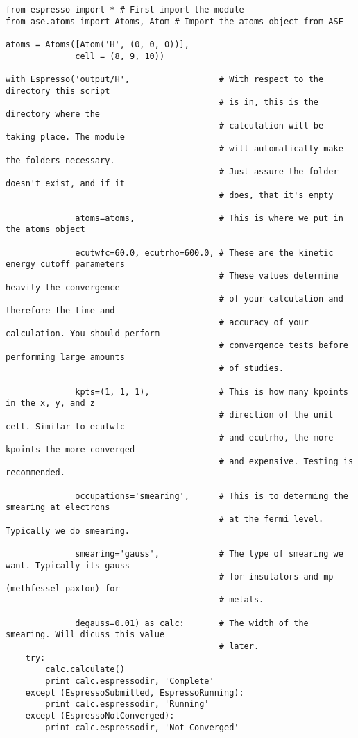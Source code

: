 \documentclass[colorlinks=true,urlcolor=blue,linkcolor=blue,citecolor=red]{article}
\begin{document}
\begin{verbatim}
from espresso import * # First import the module
from ase.atoms import Atoms, Atom # Import the atoms object from ASE

atoms = Atoms([Atom('H', (0, 0, 0))],
              cell = (8, 9, 10))

with Espresso('output/H',                  # With respect to the directory this script
                                           # is in, this is the directory where the
                                           # calculation will be taking place. The module
                                           # will automatically make the folders necessary.
                                           # Just assure the folder doesn't exist, and if it
                                           # does, that it's empty

              atoms=atoms,                 # This is where we put in the atoms object

              ecutwfc=60.0, ecutrho=600.0, # These are the kinetic energy cutoff parameters
                                           # These values determine heavily the convergence
                                           # of your calculation and therefore the time and
                                           # accuracy of your calculation. You should perform
                                           # convergence tests before performing large amounts
                                           # of studies.

              kpts=(1, 1, 1),              # This is how many kpoints in the x, y, and z
                                           # direction of the unit cell. Similar to ecutwfc
                                           # and ecutrho, the more kpoints the more converged
                                           # and expensive. Testing is recommended.

              occupations='smearing',      # This is to determing the smearing at electrons
                                           # at the fermi level. Typically we do smearing.

              smearing='gauss',            # The type of smearing we want. Typically its gauss
                                           # for insulators and mp (methfessel-paxton) for
                                           # metals.

              degauss=0.01) as calc:       # The width of the smearing. Will dicuss this value
                                           # later.
    try:
        calc.calculate()
        print calc.espressodir, 'Complete'
    except (EspressoSubmitted, EspressoRunning):
        print calc.espressodir, 'Running'
    except (EspressoNotConverged):
        print calc.espressodir, 'Not Converged'
\end{verbatim}
\end{document}
